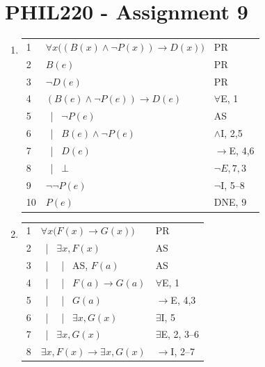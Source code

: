 \documentclass{article}
\newcommand{\asbar}{\ | \ }
\begin{document}
\section*{PHIL220 - Assignment 9}

\begin{enumerate}

    \item %
          \begin{tabular}{l|p{8cm}l}
              \hline
              1  & $\forall x\big((B(x)\land\neg P(x))\to D(x)\big)$ & PR            \\
              2  & $B(e)$                                            & PR            \\
              3  & $\neg D(e)$                                       & PR            \\
              4  & $(B(e)\land\neg P(e))\to D(e)$                    & $\forall$E, 1 \\
              5  & \asbar $\neg P(e)$                                & AS            \\
              6  & \asbar $B(e)\land\neg P(e)$                       & $\land$I, 2,5 \\
              7  & \asbar $D(e)$                                     & $\to$E, 4,6   \\
              8  & \asbar $\bot$                                     & $\neg E, 7,3$ \\
              9  & $\neg\neg P(e)$                                   & $\neg$I, 5--8 \\
              10 & $P(e)$                                            & DNE, 9        \\
              \hline
          \end{tabular}

          \vspace{6pt}

    \item %
          \begin{tabular}{l|p{8cm}l}
              \hline
              1 & $\forall x\big(F(x)\to G(x)\big)$ & PR                  \\
              2 & \asbar $\exists x,F(x)$           & AS                  \\
              3 & \asbar \asbar AS, $F(a)$          & AS                  \\
              4 & \asbar \asbar $F(a)\to G(a)$      & $\forall$E, 1       \\
              5 & \asbar \asbar $G(a)$              & $\to$E, 4,3         \\
              6 & \asbar \asbar $\exists x,G(x)$    & $\exists$I, 5       \\
              7 & \asbar $\exists x,G(x)$           & $\exists$E, 2, 3--6 \\
              8 & $\exists x,F(x)\to\exists x,G(x)$ & $\to$I, 2--7        \\
              \hline
          \end{tabular}


\end{enumerate}
\end{document}
